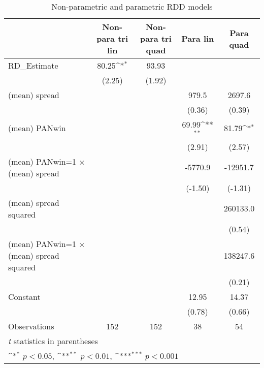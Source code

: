 \begin{table}[htbp]\centering
\def\sym#1{\ifmmode^{#1}\else\(^{#1}\)\fi}
\caption{Non-parametric and parametric RDD models\label{tab:model2}}
\begin{tabular}{l*{4}{c}}
\toprule
                    &\multicolumn{1}{c}{Non-para tri lin}&\multicolumn{1}{c}{Non-para tri quad}&\multicolumn{1}{c}{Para lin}&\multicolumn{1}{c}{Para quad}\\
\midrule
RD\_Estimate         &       80.25\sym{*}  &       93.93         &                     &                     \\
                    &      (2.25)         &      (1.92)         &                     &                     \\
\addlinespace
(mean) spread       &                     &                     &       979.5         &      2697.6         \\
                    &                     &                     &      (0.36)         &      (0.39)         \\
\addlinespace
(mean) PANwin       &                     &                     &       69.99\sym{**} &       81.79\sym{*}  \\
                    &                     &                     &      (2.91)         &      (2.57)         \\
\addlinespace
(mean) PANwin=1 $\times$ (mean) spread&                     &                     &     -5770.9         &    -12951.7         \\
                    &                     &                     &     (-1.50)         &     (-1.31)         \\
\addlinespace
(mean) spread squared&                     &                     &                     &    260133.0         \\
                    &                     &                     &                     &      (0.54)         \\
\addlinespace
(mean) PANwin=1 $\times$ (mean) spread squared&                     &                     &                     &    138247.6         \\
                    &                     &                     &                     &      (0.21)         \\
\addlinespace
Constant            &                     &                     &       12.95         &       14.37         \\
                    &                     &                     &      (0.78)         &      (0.66)         \\
\midrule
Observations        &         152         &         152         &          38         &          54         \\
\bottomrule
\multicolumn{5}{l}{\footnotesize \textit{t} statistics in parentheses}\\
\multicolumn{5}{l}{\footnotesize \sym{*} \(p<0.05\), \sym{**} \(p<0.01\), \sym{***} \(p<0.001\)}\\
\end{tabular}
\end{table}
